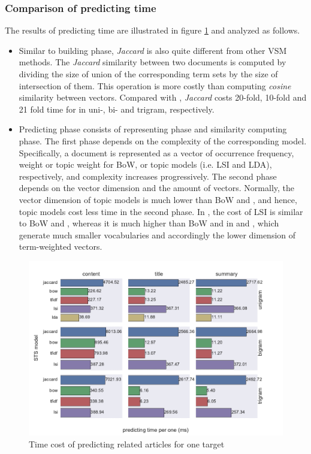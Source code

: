 \subsubsection{Comparison of predicting time}

The results of predicting time are illustrated in figure \ref{fig:predict_time} and analyzed as follows. 


\begin{itemize}
\item Similar to building phase, \textit{Jaccard} is also quite different from other VSM methods. The \textit{Jaccard} similarity between two documents is computed by dividing the size of union of the corresponding term sets by the size of intersection of them. This operation is more costly than computing \textit{cosine} similarity between vectors. Compared with \tfidf{}, \textit{Jaccard} costs 20-fold, 10-fold and 21 fold time for \icontent{} in uni-, bi- and trigram, respectively.

\item Predicting phase consists of representing phase and similarity computing phase. The first phase depends on the complexity of the corresponding model. Specifically, a document is represented as a vector of occurrence frequency, \tfidf{} weight or topic weight for BoW, \tfidf{} or topic models (i.e. LSI and LDA), respectively, and complexity increases progressively. The second phase depends on the vector dimension and the amount of vectors. Normally, the vector dimension of topic models is much lower than BoW and \tfidf{}, and hence, topic models cost less time in the second phase. In \icontent{}, the cost of LSI is similar to BoW and \tfidf{}, whereas it is much higher than BoW and \tfidf{} in \ititle{} and \isummary{}, which generate much smaller vocabularies and accordingly the lower dimension of term-weighted vectors. 

\end{itemize} 
\clearpage

\begin{figure}[!htb]
    \centering
    \includegraphics[width=\textwidth]{fig/predicting_time}
    \caption{Time cost of predicting related articles for one target}
    \label{fig:predict_time}
\end{figure}

